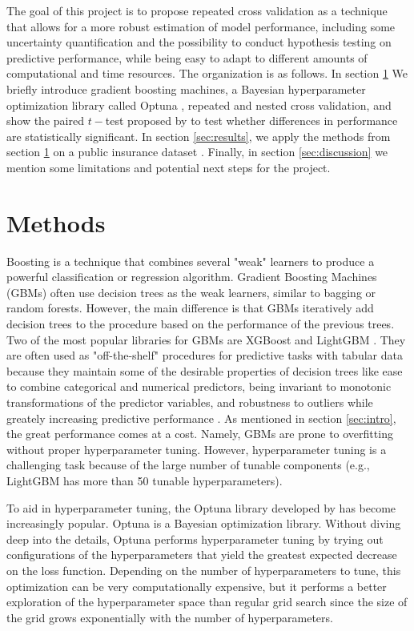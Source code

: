\documentclass[11pt,a4paper]{article}
\theoremstyle{plain}
\theoremstyle{definition}
\begin{document}
The goal of this project is to propose repeated cross validation as a technique that allows for a more robust estimation of model performance, including some uncertainty quantification and the possibility to conduct hypothesis testing on predictive performance, while being easy to adapt to different amounts of computational and time resources. The organization is as follows. In section \ref{sec:methods} We briefly introduce gradient boosting machines, a Bayesian hyperparameter optimization library called Optuna \citep{optuna}, repeated and nested cross validation, and show the paired $t-$test proposed by \cite{ttest} to test whether differences in performance are statistically significant. In section \ref{sec:results}, we apply the methods from section \ref{sec:methods} on a public insurance dataset \citep{allstate-claims-severity}. Finally, in section \ref{sec:discussion} we mention some limitations and potential next steps for the project.

\section{Methods}
\label{sec:methods}

Boosting is a technique that combines several "weak" learners to produce a powerful classification or regression algorithm. Gradient Boosting Machines (GBMs) often use decision trees as the weak learners, similar to bagging or random forests. However, the main difference is that GBMs iteratively add decision trees to the procedure based on the performance of the previous trees. Two of the most popular libraries for GBMs are XGBoost \citep{xgboost} and LightGBM \citep{lightgbm}. They are often used as "off-the-shelf" procedures for predictive tasks with tabular data because they maintain some of the desirable properties of decision trees like ease to combine categorical and numerical predictors, being invariant to monotonic transformations of the predictor variables, and robustness to outliers while greately increasing predictive performance \citep{esl}. As mentioned in section \ref{sec:intro}, the great performance comes at a cost. Namely, GBMs are prone to overfitting without proper hyperparameter tuning. However, hyperparameter tuning is a challenging task because of the large number of tunable components (e.g., LightGBM has more than 50 tunable hyperparameters).

To aid in hyperparameter tuning, the Optuna library developed by \citet{optuna} has become increasingly popular. Optuna is a Bayesian optimization library. Without diving deep into the details, Optuna performs hyperparameter tuning by trying out configurations of the hyperparameters that yield the greatest expected decrease on the loss function. Depending on the number of hyperparameters to tune, this optimization can be very computationally expensive, but it performs a better exploration of the hyperparameter space than regular grid search since the size of the grid grows exponentially with the number of hyperparameters.
\end{document}
